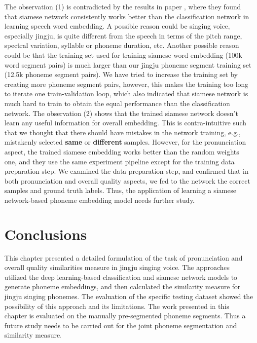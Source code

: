 The observation (1) is contradicted by the results in paper \cite{Kampera,Settle2016a}, where they found that siamese network consistently works better than the classification network in learning speech word embedding. A possible reason could be singing voice, especially jingju, is quite different from the speech in terms of the pitch range, spectral variation, syllable or phoneme duration, etc. Another possible reason could be that the training set used for training siamese word embedding (100k word segment pairs) is much larger than our jingju phoneme segment training set (12.5k phoneme segment pairs). We have tried to increase the training set by creating more phoneme segment pairs, however, this makes the training too long to iterate one train-validation loop, which also indicated that siamese network is much hard to train to obtain the equal performance than the classification network. The observation (2) shows that the trained siamese network doesn't learn any useful information for overall embedding. This is contra-intuitive such that we thought that there should have mistakes in the network training, e.g., mistakenly selected \textbf{same} or \textbf{different} samples. However, for the pronunciation aspect, the trained siamese embedding works better than the random weights one, and they use the same experiment pipeline except for the training data preparation step. We examined the data preparation step, and confirmed that in both pronunciation and overall quality aspects, we fed to the network the correct samples and ground truth labels. Thus, the application of learning a siamese network-based phoneme embedding model needs further study.

\section{Conclusions}

This chapter presented a detailed formulation of the task of pronunciation and overall quality similarities measure in jingju singing voice. The approaches utilized the deep learning-based classification and siamese network models to generate phoneme embeddings, and then calculated the similarity measure for jingju singing phonemes. The evaluation of the specific testing dataset showed the possibility of this approach and its limitations. The work presented in this chapter is evaluated on the manually pre-segmented phoneme segments. Thus a future study needs to be carried out for the joint phoneme segmentation and similarity measure.

